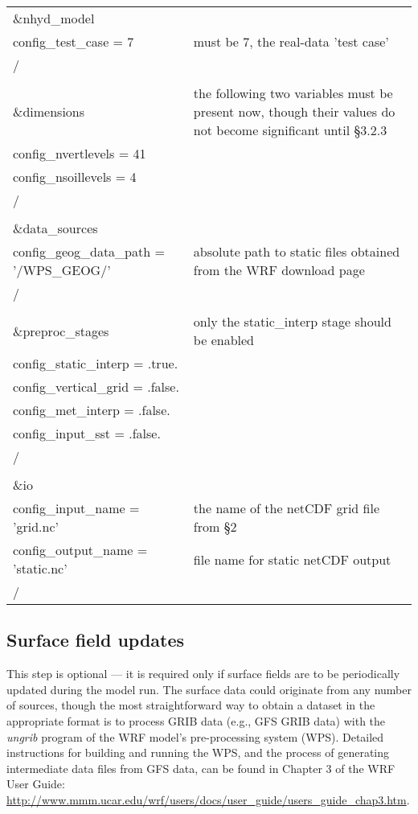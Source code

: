 \begin{longtable}{p{3.0in} |p{3.25in}}

\&nhyd\_model\\
   config\_test\_case       = 7                      & must be 7, the real-data 'test case' \\
/\\
\\
\&dimensions                                         & the following two variables must be present now, though their values do not become significant until \S 3.2.3 \\
   config\_nvertlevels     = 41                      &  \\
   config\_nsoillevels     = 4                       &  \\
/\\
\\
\&data\_sources\\
   config\_geog\_data\_path  = '/WPS\_GEOG/'         & absolute path to static files obtained from the WRF download page\\
/\\
\\
\&preproc\_stages                                    & only the static\_interp stage should be enabled \\
   config\_static\_interp   = .true.                 & \\
   config\_vertical\_grid   = .false.                & \\
   config\_met\_interp      = .false.                & \\
   config\_input\_sst       = .false.                & \\
/\\
\\
\&io\\
   config\_input\_name         = 'grid.nc'           & the name of the netCDF grid file from \S 2 \\
   config\_output\_name        = 'static.nc'         & file name for static netCDF output \\
/\\

\end{longtable}


\subsection{Surface field updates}

This step is optional --- it is required only if surface fields are to be periodically updated during the model run.  The surface data could originate from any number of sources, though the most straightforward way to obtain a dataset in the appropriate format is to process GRIB data (e.g., GFS GRIB data) with the {\em ungrib} program of the WRF model's pre-processing system (WPS).  Detailed instructions for building and running the WPS, and the process of generating intermediate data files from GFS data, can be found in Chapter 3 of the WRF User Guide: \url{http://www.mmm.ucar.edu/wrf/users/docs/user\_guide/users\_guide\_chap3.htm}.

